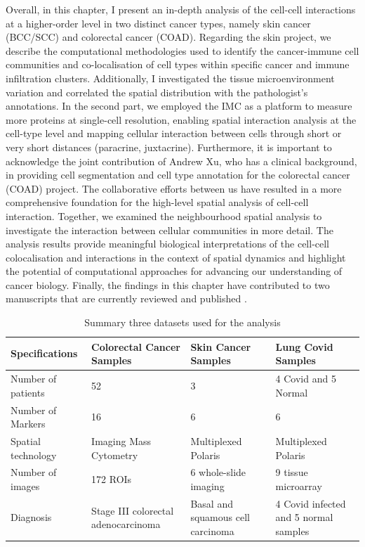 Overall, in this chapter, I present an in-depth analysis of the cell-cell interactions at a higher-order level in two distinct cancer types, namely skin cancer (BCC/SCC) and colorectal cancer (COAD). Regarding the skin project, we describe the computational methodologies used to identify the cancer-immune cell communities and co-localisation of cell types within specific cancer and immune infiltration clusters. Additionally, I investigated the tissue microenvironment variation and correlated the spatial distribution with the pathologist's annotations. In the second part, we employed the IMC as a platform  to measure more proteins at single-cell resolution, enabling spatial interaction analysis at the cell-type level and mapping cellular interaction between cells through short or very short distances (paracrine, juxtacrine). Furthermore, it is important to acknowledge the joint contribution of Andrew Xu, who has a clinical background, in providing cell segmentation and cell type annotation for the colorectal cancer (COAD) project. The collaborative efforts between us have resulted in a more comprehensive foundation for the high-level spatial analysis of cell-cell interaction. Together, we examined the neighbourhood spatial analysis to investigate the interaction between cellular communities in more detail. The analysis results provide meaningful biological interpretations of the cell-cell colocalisation and interactions in the context of spatial dynamics and highlight the potential of computational approaches for advancing our understanding of cancer biology. Finally, the findings in this chapter have contributed to two manuscripts that are currently reviewed and published \cite{grice2023comparative, Tan2023multiomics}.  

\begin{table}[ht]
\centering
\caption{Summary three datasets used for the analysis}
\begin{tabular}{||P{4cm} || P{3cm} || P{3cm} || P{3cm} || } 
 \hline
 Specifications & Colorectal Cancer Samples & Skin Cancer Samples  & Lung Covid Samples \\ [0.33ex] 
 \hline\hline
 Number of patients & 52 & 3 & 4 Covid and 5 Normal \\ 
 \hline
 Number of Markers & 16  & 6  & 6 \\ 
 \hline
 Spatial technology & Imaging Mass Cytometry & Multiplexed Polaris & Multiplexed Polaris  \\ 
 \hline
 Number of images & 172 ROIs &  6 whole-slide imaging &  9 tissue microarray \\
 \hline
 Diagnosis & Stage III colorectal adenocarcinoma & Basal and squamous cell carcinoma & 4 Covid infected and 5 normal samples  \\ [1ex] 
 \hline
\end{tabular}
\label{table:Chapt3_DataInfor}
\end{table}
